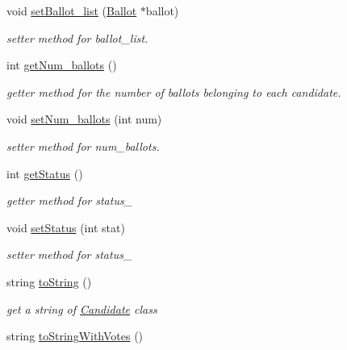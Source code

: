 \begin{DoxyCompactItemize}
void \hyperlink{classCandidate_a1e3e55cb3e44594f80d7089683f4333a}{set\+Ballot\+\_\+list} (\hyperlink{classBallot}{Ballot} $\ast$ballot)
\begin{DoxyCompactList}\small\item\em setter method for ballot\+\_\+list. \end{DoxyCompactList}\item 
int \hyperlink{classCandidate_a7f4711f9647a9dbb69e922eea9749bb8}{get\+Num\+\_\+ballots} ()
\begin{DoxyCompactList}\small\item\em getter method for the number of ballots belonging to each candidate. \end{DoxyCompactList}\item 
void \hyperlink{classCandidate_a15c9e928438be0c1997627d556556cb6}{set\+Num\+\_\+ballots} (int num)
\begin{DoxyCompactList}\small\item\em setter method for num\+\_\+ballots. \end{DoxyCompactList}\item 
int \hyperlink{classCandidate_a0ec5a848a4dbe18dfa37b69c11ee8ca4}{get\+Status} ()
\begin{DoxyCompactList}\small\item\em getter method for status\+\_\+ \end{DoxyCompactList}\item 
void \hyperlink{classCandidate_a52f17081c446df1a0f7da93b066eeab8}{set\+Status} (int stat)
\begin{DoxyCompactList}\small\item\em setter method for status\+\_\+ \end{DoxyCompactList}\item 
string \hyperlink{classCandidate_a0c4ea7fcbf389663318c4d44f8d29a74}{to\+String} ()\hypertarget{classCandidate_a0c4ea7fcbf389663318c4d44f8d29a74}{}\label{classCandidate_a0c4ea7fcbf389663318c4d44f8d29a74}

\begin{DoxyCompactList}\small\item\em get a string of \hyperlink{classCandidate}{Candidate} class \end{DoxyCompactList}\item 
string \hyperlink{classCandidate_abaeeda8922ccf4eaf526d11a4ae549a1}{to\+String\+With\+Votes} ()\hypertarget{classCandidate_abaeeda8922ccf4eaf526d11a4ae549a1}{}\label{classCandidate_abaeeda8922ccf4eaf526d11a4ae549a1}


\end{DoxyCompactItemize}
